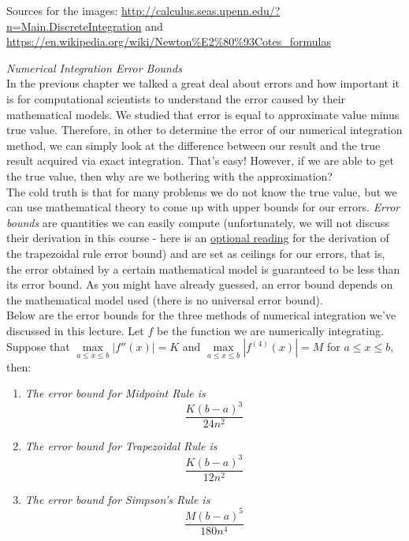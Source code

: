 \documentclass[11pt,a4paper,oneside]{report}
\begin{document}
Sources for the images: \url{http://calculus.seas.upenn.edu/?n=Main.DiscreteIntegration} and 
\url{https://en.wikipedia.org/wiki/Newton%E2%80%93Cotes_formulas}

\newpage
{\it\Large\color{red} Numerical Integration Error Bounds}\\

In the previous chapter we talked a great deal about errors and how important it is for computational scientists to understand the error caused by their mathematical models. We studied that error is equal to approximate value minus true value. Therefore, in other to determine the error of our numerical integration method, we can simply look at the difference between our result and the true result acquired via exact integration. That's easy! However, if we are able to get the true value, then why are we bothering with the approximation? \\

The cold truth is that for many problems we do not know the true value, but we can use mathematical theory to come up with upper bounds for our errors. \emph{Error bounds} are quantities we can easily compute (unfortunately, we will not discuss their derivation in this course - here is an \href{http://www.math.ucsd.edu/~ebender/20B/77_Trap.pdf}{optional reading} for the derivation of the trapezoidal rule error bound) and are set as ceilings for our errors, that is, the error obtained by a certain mathematical model is guaranteed to be less than its error bound. As you might have already guessed, an error bound depends on the mathematical model used (there is no universal error bound).\\

Below are the error bounds for the three methods of numerical integration we've discussed in this lecture. Let $f$ be the function we are numerically integrating. Suppose that $\max\limits_{a \leq x \leq b}|f''(x)| = K$ and $\max\limits_{a \leq x \leq b}|f^{(4)}(x)| = M$ for $a \leq x \leq b$, then:

\begin{enumerate}
\item \emph{The error bound for Midpoint Rule is}
\[\frac{K(b-a)^3}{24n^2}\]
\item \emph{The error bound for Trapezoidal Rule is}
\[\frac{K(b-a)^3}{12n^2}\]
\item \emph{The error bound for Simpson's Rule is}
\[\frac{M(b-a)^5}{180n^4}\]
\end{enumerate}
\end{document}
